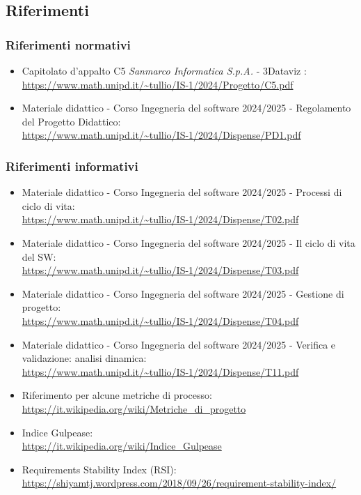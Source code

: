     \subsection{Riferimenti}
        \subsubsection{Riferimenti normativi}
        \begin{itemize}
            \item Capitolato d'appalto C5 \textit{Sanmarco Informatica S.p.A.} - 3Dataviz : \\ \url{https://www.math.unipd.it/~tullio/IS-1/2024/Progetto/C5.pdf}
            \item Materiale didattico - Corso Ingegneria del software 2024/2025 - Regolamento del Progetto Didattico: \\ \url{https://www.math.unipd.it/~tullio/IS-1/2024/Dispense/PD1.pdf}
        \end{itemize}
        \subsubsection{Riferimenti informativi}
        \begin{itemize}
            \item Materiale didattico - Corso Ingegneria del software 2024/2025 - Processi di ciclo di vita: \\ \url{https://www.math.unipd.it/~tullio/IS-1/2024/Dispense/T02.pdf}
            \item Materiale didattico - Corso Ingegneria del software 2024/2025 - Il ciclo di vita del SW: \\ \url{https://www.math.unipd.it/~tullio/IS-1/2024/Dispense/T03.pdf}
            \item Materiale didattico - Corso Ingegneria del software 2024/2025 - Gestione di progetto: \\ \url{https://www.math.unipd.it/~tullio/IS-1/2024/Dispense/T04.pdf}
            \item Materiale didattico - Corso Ingegneria del software 2024/2025 - Verifica e validazione: analisi dinamica: \\ \url{https://www.math.unipd.it/~tullio/IS-1/2024/Dispense/T11.pdf}
            \item Riferimento per alcune metriche di processo: \\ \url{https://it.wikipedia.org/wiki/Metriche_di_progetto}
            \item Indice Gulpease: \\ \url{https://it.wikipedia.org/wiki/Indice_Gulpease}
            \item Requirements Stability Index (RSI): \\ \url{https://shiyamtj.wordpress.com/2018/09/26/requirement-stability-index/}
        
        \end{itemize}
